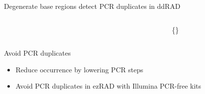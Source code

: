 \documentclass[presentation]{beamer}
\begin{document}
\begin{frame}[label={sec:orgca97312}]{Degenerate base regions detect PCR duplicates in ddRAD \citep{Tin2014,Schweyen2014}}
\begin{latex}
\vspace{0.1cm}
\end{latex}

\begin{columns}
\begin{column}{0.3\columnwidth}
\begin{latex}
\end{latex}
\end{column}

\begin{column}{0.3\columnwidth}
\begin{latex}
\end{latex}
\end{column}

\begin{column}{0.3\columnwidth}
\begin{latex}
\tiny\{\citep{Schweyen2014}\}
\end{latex}
\end{column}
\end{columns}
\end{frame}

\begin{frame}[label={sec:org88287e1}]{Avoid PCR duplicates}
\begin{itemize}
\item Reduce occurrence by lowering PCR steps
\item Avoid PCR duplicates in ezRAD with Illumina PCR-free kits
\end{itemize}
\end{frame}
\end{document}
